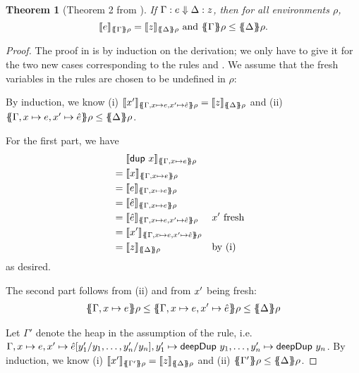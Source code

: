 \documentclass[preprint]{sigplanconf}
\newtheorem{theorem}{Theorem}
\theoremstyle{nonumberplain}
\newtheorem{proof}{Proof}
\begin{document}
\begin{theorem}[Theorem 2 from \citep{launchbury}]
If $\Gamma : e \Downarrow \Delta : z$, then for all environments $\rho$,
\[
\dsem e {\esem \Gamma \rho} = \dsem z {\esem \Delta \rho}
\text{ and }
\esem \Gamma \rho \le \esem \Delta \rho.
\]
\end{theorem}
\begin{proof}
The proof in \citep{launchbury} is by induction on the derivation; we only have to give it for the two new cases corresponding to the rules  and . We assume that the fresh variables in the rules are chosen to be undefined in $\rho$:

By induction, we know (i) $\dsem{\fresh x}{\esem{\Gamma, x \mapsto e, \fresh x \mapsto \hat e} \rho} = \dsem{z}{\esem \Delta \rho}$ and (ii) $\esem{\Gamma, x \mapsto e, \fresh x \mapsto \hat e} \rho \le \esem \Delta \rho$.

For the first part, we have 
\begin{align*}
&\phantom{{}={}}\dsem{\sDup x}{\esem{\Gamma, x\mapsto e}\rho}\\
&= \dsem{x}{\esem{\Gamma, x\mapsto e}\rho}\\
&= \dsem{e}{\esem{\Gamma, x\mapsto e}\rho}\\
&= \dsem{\hat e}{\esem{\Gamma, x\mapsto e}\rho}\\
&= \dsem{\hat e}{\esem{\Gamma, x\mapsto e, \fresh x \mapsto \hat e}\rho} && \text{$\fresh x$ fresh}\\
&= \dsem{\fresh x}{\esem{\Gamma, x\mapsto e, \fresh x \mapsto \hat e}\rho} \\
&= \dsem{z}{\esem \Delta \rho} &&\text{by (i)}
\end{align*}
as desired.

The second part follows from (ii) and from $x'$ being fresh:
\begin{align*}
\esem{\Gamma, x\mapsto e}\rho \le \esem{\Gamma, x\mapsto e, \fresh x\mapsto \hat e} \rho \le \esem{\Delta}\rho
\end{align*}

Let \mbox{$\Gamma'$} denote the heap in the assumption of the rule, i.e. $\Gamma, x\mapsto e, x'\mapsto \hat e[y'_1/y_1,\ldots,y'_n/y_n],\allowbreak y'_1 \mapsto \text{\textsf{deepDup}}\ y_1,\ldots,\allowbreak y'_n \mapsto \text{\textsf{deepDup}}\ y_n$.
By induction, we know (i) $\dsem{\fresh x}{\esem{\Gamma'} \rho} = \dsem{z}{\esem \Delta \rho}$ and (ii) $\esem{\Gamma'} \rho \le \esem \Delta \rho$.


\end{proof}
\end{document}
